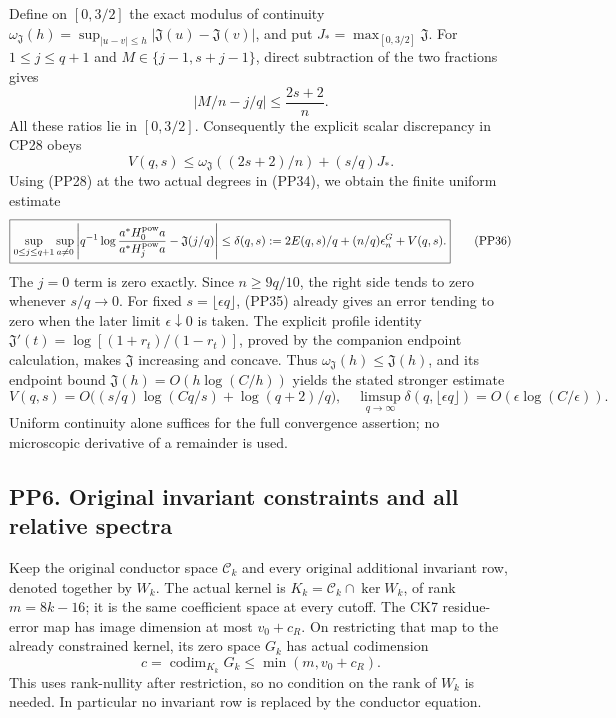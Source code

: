 \documentclass[10pt]{article}
\begin{document}
Define on \([0,3/2]\) the exact modulus of continuity \(\omega_{\mathfrak J}(h)=\sup_{|u-v|\le h}|\mathfrak J(u)-\mathfrak J(v)|\), and put \(J_* =\max_{[0,3/2]}\mathfrak J\). For \(1\le j\le q+1\) and \(M\in\{j-1,s+j-1\}\), direct subtraction of the two fractions gives \[
|M/n-j/q|\le\frac{2s+2}{n}.
\] All these ratios lie in \([0,3/2]\). Consequently the explicit scalar discrepancy in CP28 obeys \[
V(q,s)\le\omega_{\mathfrak J}((2s+2)/n)+(s/q)J_*.
\tag{PP35}
\] Using (PP28) at the two actual degrees in (PP34), we obtain the finite uniform estimate \[
\boxed{
\sup_{0\le j\le q+1}\sup_{a\ne0}
\left|q^{-1}\log\frac{a^*H_0^{\rm pow}a}{a^*H_j^{\rm pow}a}
-\mathfrak J(j/q)\right|
\le\delta(q,s):=2E(q,s)/q+(n/q)\epsilon_n^G+V(q,s).
}
\tag{PP36}
\] The \(j=0\) term is zero exactly. Since \(n\ge9q/10\), the right side tends to zero whenever \(s/q\to0\). For fixed \(s=\lfloor\epsilon q\rfloor\), (PP35) already gives an error tending to zero when the later limit \(\epsilon\downarrow0\) is taken. The explicit profile identity \(\mathfrak J'(t)=\log[(1+r_t)/(1-r_t)]\), proved by the companion endpoint calculation, makes \(\mathfrak J\) increasing and concave. Thus \(\omega_{\mathfrak J}(h)\le\mathfrak J(h)\), and its endpoint bound \(\mathfrak J(h)=O(h\log(C/h))\) yields the stated stronger estimate \[
V(q,s)=O\big((s/q)\log(Cq/s)+\log(q+2)/q\big),
\quad
\limsup_{q\to\infty}\delta(q,\lfloor\epsilon q\rfloor)
=O(\epsilon\log(C/\epsilon)).
\tag{PP37}
\] Uniform continuity alone suffices for the full convergence assertion; no microscopic derivative of a remainder is used.

\subsection{PP6. Original invariant constraints and all relative spectra}\label{pp6.-original-invariant-constraints-and-all-relative-spectra}

Keep the original conductor space \(\mathcal C_k\) and every original additional invariant row, denoted together by \(W_k\). The actual kernel is \(K_k=\mathcal C_k\cap\ker W_k\), of rank \(m=8k-16\); it is the same coefficient space at every cutoff. The CK7 residue-error map has image dimension at most \(v_0+c_R\). On restricting that map to the already constrained kernel, its zero space \(G_k\) has actual codimension \[
c=\operatorname{codim}_{K_k}G_k
\le\min(m,v_0+c_R).
\tag{PP38}
\] This uses rank-nullity after restriction, so no condition on the rank of \(W_k\) is needed. In particular no invariant row is replaced by the conductor equation.
\end{document}
